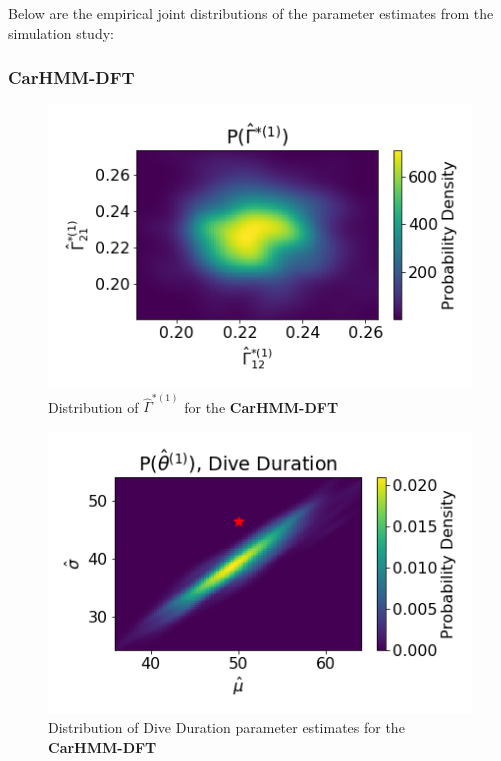 \documentclass[12pt]{TD-CJS}
\begin{document}




\iffalse

Below are the empirical joint distributions of the parameter estimates from the simulation study:

\subsubsection{CarHMM-DFT}

\begin{figure}
    \centering
    \includegraphics[width=5in]{../Plots/hmm_FV_Gamma_density_0.png}
    \caption{Distribution of $\hat \Gamma^{*(1)}$ for the \textbf{CarHMM-DFT}}
\end{figure}

\begin{figure}
    \centering
    \includegraphics[width=5in]{../Plots/hmm_FV_MLE_density_dive_duration_-1_0.png}
    \caption{Distribution of Dive Duration parameter estimates for the \textbf{CarHMM-DFT}}
\end{figure}
\end{document}
